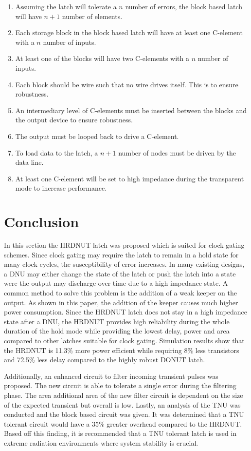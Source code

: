 \begin{enumerate}
	\item Assuming the latch will tolerate a $n$ number of errors, the block based latch will have $n+1$ number of elements.
	\item Each storage block in the block based latch will have at least one C-element with a $n$ number of inputs.
	\item At least one of the blocks will have two C-elements with a $n$ number of inputs.
	\item Each block should be wire such that no wire drives itself. This is to ensure robustness.
	\item An intermediary level of C-elements must be inserted between the blocks and the output device to ensure robustness.
	\item The output must be looped back to drive a C-element.
	\item To load data to the latch, a $n+1$ number of nodes must be driven by the data line. 
	\item At least one C-element will be set to high impedance during the transparent mode to increase performance.
\end{enumerate}
 
\section{Conclusion} \label{sec:conc}
In this section the HRDNUT latch was proposed which is suited for clock gating schemes. Since clock gating may require the latch to remain in a hold state for many clock cycles, the susceptibility of error increases. In many existing designs, a DNU may either change the state of the latch or push the latch into a state were the output may discharge over time due to a high impedance state. A common method to solve this problem is the addition of a weak keeper on the output. As shown in this paper, the addition of the keeper causes much higher power consumption. Since the HRDNUT latch does not stay in a high impedance state after a DNU, the HRDNUT provides high reliability during the whole duration of the hold mode while providing the lowest delay, power and area compared to other latches suitable for clock gating. Simulation results show that the HRDNUT is 11.3\% more power efficient while requiring 8\% less transistors and 72.5\% less delay compared to the highly robust DONUT latch. 

Additionally, an enhanced circuit to filter incoming transient pulses was proposed. The new circuit is able to tolerate a single error during the filtering phase. The area additional area of the new filter circuit is dependent on the size of the expected transient but overall is low. Lastly, an analysis of the TNU was conducted and the block based circuit was given. It was determined that a TNU tolerant circuit would have a 35\% greater overhead compared to the HRDNUT. Based off this finding, it is recommended that a TNU tolerant latch is used in extreme radiation environments where system stability is crucial.